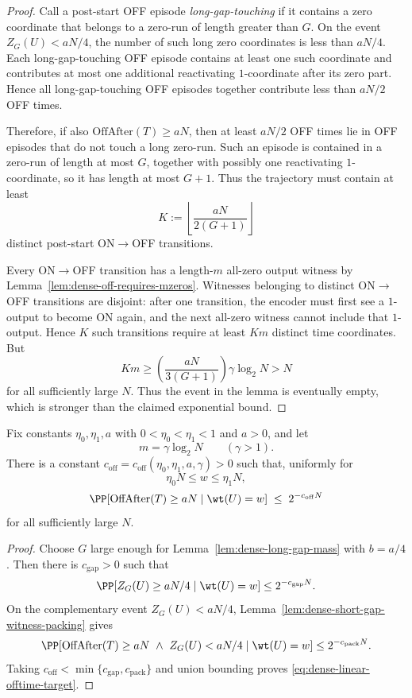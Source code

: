 \begin{proof}
Call a post-start OFF episode \emph{long-gap-touching} if it contains a zero coordinate that belongs to a zero-run of
length greater than \(G\). On the event \(Z_G(U)<aN/4\), the number of such long zero coordinates is less than \(aN/4\).
Each long-gap-touching OFF episode contains at least one such coordinate and contributes at most one additional
reactivating \(1\)-coordinate after its zero part. Hence all long-gap-touching OFF episodes together contribute less
than \(aN/2\) OFF times.

Therefore, if also \(\mathrm{OffAfter}(T)\ge aN\), then at least \(aN/2\) OFF times lie in OFF episodes that do not
touch a long zero-run. Such an episode is contained in a zero-run of length at most \(G\), together with possibly one
reactivating \(1\)-coordinate, so it has length at most \(G+1\). Thus the trajectory must contain at least
\[
K:=\left\lfloor \frac{aN}{2(G+1)}\right\rfloor
\]
distinct post-start ON\(\to\)OFF transitions.

Every ON\(\to\)OFF transition has a length-\(m\) all-zero output witness by
Lemma~\ref{lem:dense-off-requires-mzeros}. Witnesses belonging to distinct ON\(\to\)OFF transitions are disjoint: after
one transition, the encoder must first see a \(1\)-output to become ON again, and the next all-zero witness cannot
include that \(1\)-output. Hence \(K\) such transitions require at least \(Km\) distinct time coordinates. But
\[
Km
\ge
\left(\frac{aN}{3(G+1)}\right)\gamma\log_2N
>
N
\]
for all sufficiently large \(N\). Thus the event in the lemma is eventually empty, which is stronger than the claimed
exponential bound.
\end{proof}

\begin{lemma}
\label{lem:dense-linear-offtime-target}
Fix constants \(\eta_0,\eta_1,a\) with \(0<\eta_0<\eta_1<1\) and \(a>0\), and let
\[
m=\gamma\log_2 N
\qquad(\gamma>1).
\]
There is a constant \(c_{\mathrm{off}}=c_{\mathrm{off}}(\eta_0,\eta_1,a,\gamma)>0\) such that, uniformly for
\[
\eta_0N\le w\le \eta_1N,
\]
\begin{equation}
\label{eq:dense-linear-offtime-target}
\PP[\mathrm{OffAfter}(T)\ge aN\mid \wt(U)=w]
\;\le\;
2^{-c_{\mathrm{off}}N}
\end{equation}
for all sufficiently large \(N\).
\end{lemma}

\begin{proof}
Choose \(G\) large enough for Lemma~\ref{lem:dense-long-gap-mass} with \(b=a/4\). Then there is
\(c_{\mathrm{gap}}>0\) such that
\[
\PP[Z_G(U)\ge aN/4\mid \wt(U)=w]\le 2^{-c_{\mathrm{gap}}N}.
\]
On the complementary event \(Z_G(U)<aN/4\), Lemma~\ref{lem:dense-short-gap-witness-packing} gives
\[
\PP[\mathrm{OffAfter}(T)\ge aN\ \wedge\ Z_G(U)<aN/4\mid \wt(U)=w]\le 2^{-c_{\mathrm{pack}}N}.
\]
Taking \(c_{\mathrm{off}}<\min\{c_{\mathrm{gap}},c_{\mathrm{pack}}\}\) and union bounding proves
\eqref{eq:dense-linear-offtime-target}.
\end{proof}

